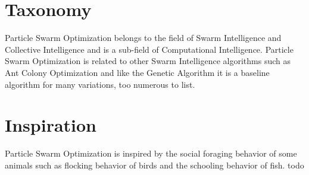 \documentclass[a4paper, 11pt]{article}
\begin{document}
\section{Taxonomy}
\label{sec:taxonomy}
Particle Swarm Optimization belongs to the field of Swarm Intelligence and Collective Intelligence and is a sub-field of Computational Intelligence.
Particle Swarm Optimization is related to other Swarm Intelligence algorithms such as Ant Colony Optimization and like the Genetic Algorithm it is a baseline algorithm for many variations, too numerous to list.

\section{Inspiration}
\label{sec:inspiration}
Particle Swarm Optimization is inspired by the social foraging behavior of some animals such as flocking behavior of birds and the schooling behavior of fish.
todo

\end{document}
